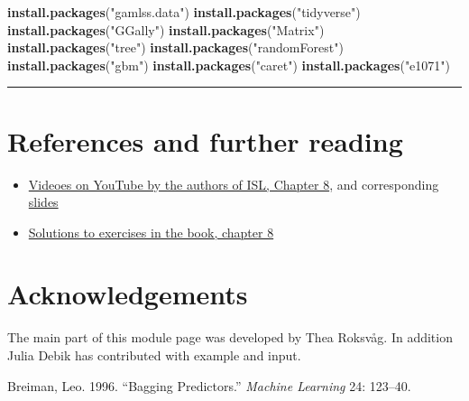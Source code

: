 \documentclass[]{article}
\newenvironment{Shaded}{\begin{snugshade}}{\end{snugshade}}
\newcommand{\KeywordTok}[1]{\textcolor[rgb]{0.13,0.29,0.53}{\textbf{#1}}}
\newcommand{\NormalTok}[1]{#1}
\newcommand{\StringTok}[1]{\textcolor[rgb]{0.31,0.60,0.02}{#1}}
\providecommand{\tightlist}{%
  \setlength{\itemsep}{0pt}\setlength{\parskip}{0pt}}
\begin{document}
\begin{Shaded}
\begin{Highlighting}[]
\KeywordTok{install.packages}\NormalTok{(}\StringTok{"gamlss.data"}\NormalTok{)}
\KeywordTok{install.packages}\NormalTok{(}\StringTok{"tidyverse"}\NormalTok{)}
\KeywordTok{install.packages}\NormalTok{(}\StringTok{"GGally"}\NormalTok{)}
\KeywordTok{install.packages}\NormalTok{(}\StringTok{"Matrix"}\NormalTok{)}
\KeywordTok{install.packages}\NormalTok{(}\StringTok{"tree"}\NormalTok{)}
\KeywordTok{install.packages}\NormalTok{(}\StringTok{"randomForest"}\NormalTok{)}
\KeywordTok{install.packages}\NormalTok{(}\StringTok{"gbm"}\NormalTok{)}
\KeywordTok{install.packages}\NormalTok{(}\StringTok{"caret"}\NormalTok{)}
\KeywordTok{install.packages}\NormalTok{(}\StringTok{"e1071"}\NormalTok{)}
\end{Highlighting}
\end{Shaded}

\begin{center}\rule{0.5\linewidth}{\linethickness}\end{center}

\hypertarget{references-and-further-reading}{%
\section{References and further
reading}\label{references-and-further-reading}}

\begin{itemize}
\tightlist
\item
  \href{https://www.youtube.com/playlist?list=PL5-da3qGB5IB23TLuA8ZgVGC8hV8ZAdGh}{Videoes
  on YouTube by the authors of ISL, Chapter 8}, and corresponding
  \href{https://lagunita.stanford.edu/c4x/HumanitiesScience/StatLearning/asset/trees.pdf}{slides}
\item
  \href{https://rstudio-pubs-static.s3.amazonaws.com/65564_925dfde884e14ef9b5735eddd16c263e.html}{Solutions
  to exercises in the book, chapter 8}
\end{itemize}

\hypertarget{acknowledgements}{%
\section{Acknowledgements}\label{acknowledgements}}

The main part of this module page was developed by Thea Roksvåg. In
addition Julia Debik has contributed with example and input.

\hypertarget{refs}{}
\leavevmode\hypertarget{ref-Bagging}{}%
Breiman, Leo. 1996. ``Bagging Predictors.'' \emph{Machine Learning} 24:
123--40.
\end{document}
